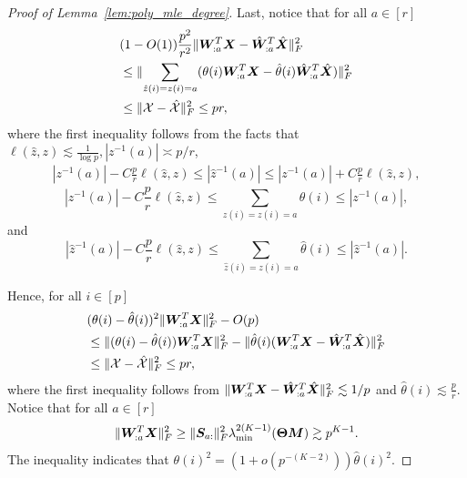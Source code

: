 \documentclass[journal]{IEEEtran}
\theoremstyle{definition}
\theoremstyle{definition}
\begin{document}
\begin{proof}[Proof of Lemma~\ref{lem:poly_mle_degree}]
Last, notice that for all $a \in [r]$
\begin{align}
    &(1 - O(1)) \frac{p^2}{r^2}\lVert\bm{W}_{:a}^T \bm X - \hat {\bm{W}}_{:a}^T \hat {\bm X}\rVert_F^2 \\
    &\leq  \lVert \sum_{\hat z(i) = z(i) = a} (\theta(i) \bm{W}_{:a}^T \bm X  - \hat \theta(i) \hat {\bm{W}}_{:a}^T \hat {\bm X})\rVert_F^2 \\
    &\leq \lVert\mathcal{X} - \hat {\mathcal{X}}\rVert_F^2 \leq p r,
\end{align}
where the first inequality follows from the facts that  $\ell(\hat z, z) \lesssim \frac{1}{\log p}, |z^{-1}(a)| \asymp p /r$, 
\begin{align}
     | z^{-1}(a)| - C \frac{p}{r} \ell(\hat z, z)  \leq |\hat z^{-1}(a)| \leq | z^{-1}(a)| + C \frac{p}{r} \ell(\hat z, z), 
\end{align}
\begin{equation}
  | z^{-1}(a)|  - C \frac{p}{r} \ell( \hat z,z)  \leq \sum_{ z(i) = z(i) = a} \theta(i) \leq | z^{-1}(a)|, 
\end{equation}
and 
\begin{equation}
    |\hat z^{-1}(a)|  - C \frac{p}{r} \ell(\hat z, z)  \leq \sum_{\hat z(i) = z(i) = a} \hat \theta(i) \leq |\hat z^{-1}(a)|.
\end{equation}

Hence, for all $i \in [p]$
\begin{align}
  &(\theta(i) - \hat \theta(i))^2 \onormSize{}{ \mW_{:a}^T \mX }_F^2 - O(p) \\
  &\leq  \onormSize{}{ (\theta(i) - \hat \theta(i))\mW_{:a}^T \mX }_F^2 - \onormSize{}{ \hat \theta(i) (\mW_{:a}^T \mX - \hat \mW_{:a}^T \hat \mX) }_F^2 \\
  &\leq \onormSize{}{\tX - \hat \tX}_F^2 \leq p r,\label{eq:theta_hat}
\end{align}
where the first inequality follows from $\lVert\bm{W}_{:a}^T \bm X - \hat {\bm{W}}_{:a}^T \hat {\bm X}\rVert_F^2 \lesssim 1/p$ and $\hat \theta(i) \lesssim \frac{p}{r}$. Notice that for all $a \in [r]$
\begin{equation}
    \lVert\bm{W}_{:a}^T \bm X\rVert_F^2 \geq \lVert\bm S_{a:}\rVert_F^2 \lambda_{\min}^{2(K-1)}(\boldsymbol{\Theta} \bm M) \gtrsim p^{K-1}.
\end{equation}
The inequality indicates that $\theta(i)^2 = (1 + o(p^{-(K-2)})) \hat \theta(i)^2$. 

\end{proof} 
\end{document}
